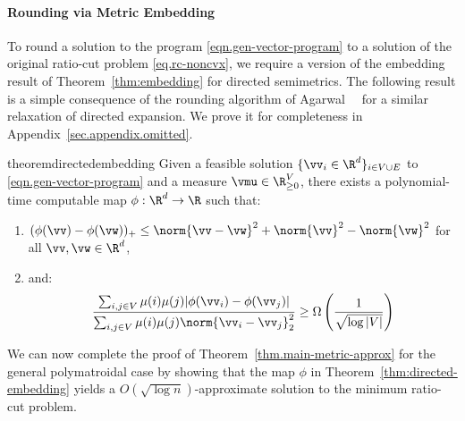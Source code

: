 \documentclass[letterpaper]{article}
\begin{document}
\paragraph{Rounding via Metric Embedding}
To round a solution to the program \eqref{eqn.gen-vector-program} to a solution of the original ratio-cut problem \eqref{eq.rc-noncvx}, we require a version of the embedding result of Theorem~\ref{thm:embedding} for directed semimetrics. The following result is a simple consequence of the rounding algorithm of Agarwal~\etal~\cite{agarwal2005log} for a similar relaxation of directed expansion. We prove it for completeness in Appendix~\ref{sec.appendix.omitted}.

\begin{restatable}{theorem}{directedembedding}
\label{thm:directed-embedding}
    Given a feasible solution $\{\vv_i \in \R^d\}_{i\in V\cup E}$ to \ref{eqn.gen-vector-program} and a measure $\vmu \in \R_{\geq 0}^V$, there exists a polynomial-time computable map $\phi:\R^d \to \R$ such that:
    \begin{enumerate}
        \item $(\phi(\vv)- \phi(\vw))_+ \leq \norm{\vv - \vw}^2 + \norm{\vv}^2 - \norm{\vw}^2$ for all $\vv, \vw \in \R^d$,
        \item and:
        \[
        \frac{\sum_{i,j \in V} \mu(i) \mu(j) |\phi(\vv_i) - \phi(\vv_j)|} {\sum_{i,j \in V} \mu(i) \mu(j) \norm{\vv_i - \vv_j}^2_2 } \geq \Omega \left(\frac{1}{\sqrt{\log |V|}}\right)
        \]
    \end{enumerate}
\end{restatable}

We can now complete the proof of Theorem~\ref{thm.main-metric-approx} for the general polymatroidal case by showing that the map $\phi$ in Theorem~\ref{thm:directed-embedding} yields a $O(\sqrt{\log n})$-approximate solution to the minimum ratio-cut problem.
\end{document}

